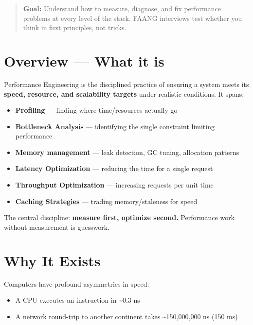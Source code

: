 \documentclass[11pt]{article}
\providecommand{\tightlist}{\setlength{\itemsep}{1pt}\setlength{\parskip}{0pt}}
\begin{document}
\makecoverpage

\thispagestyle{empty}
{\hypersetup{hidelinks}\tableofcontents}
\clearpage

\begin{quote}
\textbf{Goal:} Understand how to measure, diagnose, and fix performance problems at every level of the stack. FAANG interviews test whether you think in first principles, not tricks.
\end{quote}

\section{Overview --- What it is}\label{overview--what-it-is}

Performance Engineering is the disciplined practice of ensuring a system meets its \textbf{speed, resource, and scalability targets} under realistic conditions. It spans:

\begin{itemize}
\tightlist
\item
  \textbf{Profiling} --- finding where time/resources actually go
\item
  \textbf{Bottleneck Analysis} --- identifying the single constraint limiting performance
\item
  \textbf{Memory management} --- leak detection, GC tuning, allocation patterns
\item
  \textbf{Latency Optimization} --- reducing the time for a single request
\item
  \textbf{Throughput Optimization} --- increasing requests per unit time
\item
  \textbf{Caching Strategies} --- trading memory/staleness for speed
\end{itemize}

The central discipline: \textbf{measure first, optimize second.} Performance work without measurement is guesswork.

\section{Why It Exists}\label{why-it-exists}

Computers have profound asymmetries in speed:

\begin{itemize}
\tightlist
\item
  A CPU executes an instruction in \textasciitilde0.3 ns
\item
  A network round-trip to another continent takes \textasciitilde150,000,000 ns (150 ms)
\end{itemize}
\end{document}

